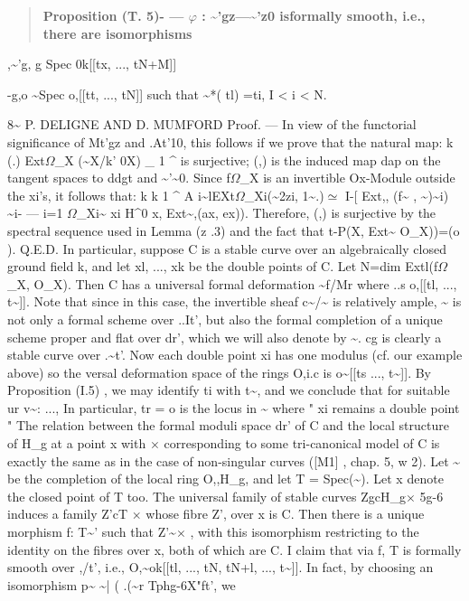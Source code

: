 \documentclass[11pt]{article}
\theoremstyle{plain}
\theoremstyle{definition}
\theoremstyle{remark}
\begin{document}
\begin{quote}\textbf{Proposition (T. 5)- --- $\varphi$ : \textasciitilde{}'gz---\textasciitilde{}'z0 isformally smooth, i.e., there are isomorphisms}\end{quote}
,\textasciitilde{}'g, g Spec 0k[[tx, ..., tN+M]]

-g,o \textasciitilde{}Spec o,[[tt, ..., tN]] such that \textasciitilde{}*( tl) =ti, I < i < N.

8\textasciitilde{} P. DELIGNE AND D. MUMFORD Proof. --- In view of the functorial significance of Mt'gz and .At'10, this follows if we prove that the natural map: k (.) Ext$\Omega$\_X (\textasciitilde{}X/k' 0X) \_ 1 \textasciicircum{} is surjective; (,) is the induced map dap on the tangent spaces to ddgt and \textasciitilde{}'\textasciitilde{}0. Since f$\Omega$\_X is an invertible Ox-Module outside the xi's, it follows that: k k 1 \textasciicircum{} A i\textasciitilde{}lEXt$\Omega$\_Xi(\textasciitilde{}2zi, 1\textasciitilde{}.)$\simeq$ I-[ Ext,, (f\textasciitilde{} , \textasciitilde{})\textasciitilde{}i) \textasciitilde{}i- --- i=1 $\Omega$\_Xi\textasciitilde{} xi H\textasciicircum{}0 x, Ext\textasciitilde{},(ax, ex)). Therefore, (,) is surjective by the spectral sequence used in Lemma (z .3) and the fact that t-P(X, Ext\textasciitilde{} O\_X))=(o ). Q.E.D. In particular, suppose C is a stable curve over an algebraically closed ground field k, and let xl, ..., xk be the double points of C. Let N=dim Extl(f$\Omega$\_X, O\_X). Then C has a universal formal deformation \textasciitilde{}f/Mr where ..s o,[[tl, ..., t\textasciitilde{}]]. Note that since in this case, the invertible sheaf c\textasciitilde{}/\textasciitilde{} is relatively ample, \textasciitilde{} is not only a formal scheme over ..It', but also the formal completion of a unique scheme proper and flat over dr', which we will also denote by \textasciitilde{}. cg is clearly a stable curve over .\textasciitilde{}t'. Now each double point xi has one modulus (cf. our example above) so the versal deformation space of the rings O,i.c is o\textasciitilde{}[[ts ..., t\textasciitilde{}]]. By Proposition (I.5) , we may identify ti with t\textasciitilde{}, and we conclude that for suitable ur v\textasciitilde{}: ..., In particular, tr = o is the locus in \textasciitilde{} where " xi remains a double point " The relation between the formal moduli space dr' of C and the local structure of H\_g at a point x with $\times$ corresponding to some tri-canonical model of C is exactly the same as in the case of non-singular curves ([M1] , chap. 5, w 2). Let \textasciitilde{} be the completion of the local ring O,,H\_g, and let T = Spec(\textasciitilde{}). Let x denote the closed point of T too. The universal family of stable curves ZgcH\_g$\times$ 5g-6 induces a family Z'cT $\times$ whose fibre Z', over x is C. Then there is a unique morphism f: T\textasciitilde{}' such that Z'\textasciitilde{}$\times$ , with this isomorphism restricting to the identity on the fibres over x, both of which are C. I claim that via f, T is formally smooth over ,/t', i.e., O,\textasciitilde{}ok[[tl, ..., tN, tN+l, ..., t\textasciitilde{}]]. In fact, by choosing an isomorphism p\textasciitilde{} \textasciitilde{}| ( .(\textasciitilde{}r Tphg-6X"ft', we 
\end{document}
